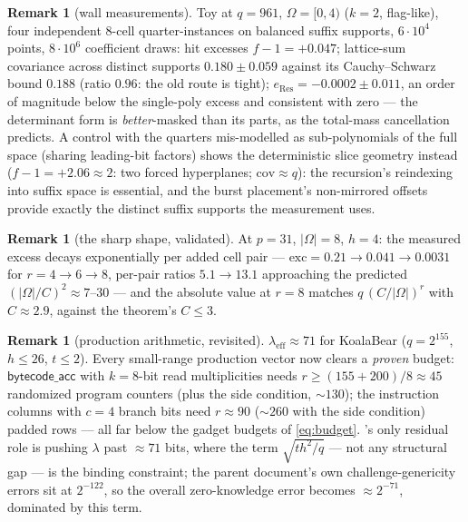 \documentclass{article}
\theoremstyle{definition}
\newtheorem{remark}[theorem]{Remark}
\begin{document}
\begin{remark}[wall measurements]\label{rem:numI}
Toy at $q = 961$, $\Omega = [0,4)$ ($k = 2$, flag-like), four independent $8$-cell quarter-instances on balanced suffix supports, $6 \cdot 10^4$ points, $8 \cdot 10^6$ coefficient draws: hit excesses $f - 1 = +0.047$; lattice-sum covariance across distinct supports $0.180 \pm 0.059$ against its Cauchy--Schwarz bound $0.188$ (ratio $0.96$: the old route is tight); $e_{\mathrm{Res}} = -0.0002 \pm 0.011$, an order of magnitude below the single-poly excess and consistent with zero --- the determinant form is \emph{better}-masked than its parts, as the total-mass cancellation predicts. A control with the quarters mis-modelled as sub-polynomials of the full space (sharing leading-bit factors) shows the deterministic slice geometry instead ($f - 1 = +2.06 \approx 2$: two forced hyperplanes; $\mathrm{cov} \approx q$): the recursion's reindexing into suffix space is essential, and the burst placement's non-mirrored offsets provide exactly the distinct suffix supports the measurement uses.
\end{remark}

\begin{remark}[the sharp shape, validated]\label{rem:numH}
At $p = 31$, $|\Omega| = 8$, $h = 4$: the measured excess decays exponentially per added cell pair --- $\mathrm{exc} = 0.21 \to 0.041 \to 0.0031$ for $r = 4 \to 6 \to 8$, per-pair ratios $5.1 \to 13.1$ approaching the predicted $(|\Omega|/C)^2 \approx 7$--$30$ --- and the absolute value at $r = 8$ matches $q\,(C/|\Omega|)^{r}$ with $C \approx 2.9$, against the theorem's $C \leq 3$.
\end{remark}

\begin{remark}[production arithmetic, revisited]\label{rem:production}
$\lambda_{\mathrm{eff}} \approx 71$ for KoalaBear ($q = 2^{155}$, $h \leq 26$, $t \leq 2$). Every small-range production vector now clears a \emph{proven} budget: $\textsf{bytecode\_acc}$ with $k = 8$-bit read multiplicities needs $r \geq (155 + 200)/8 \approx 45$ randomized program counters (plus the side condition, $\sim 130$); the instruction columns with $c = 4$ branch bits need $r \approx 90$ ($\sim 260$ with the side condition) padded rows --- all far below the gadget budgets of \cref{eq:budget}. 's only residual role is pushing $\lambda$ past $\approx 71$ bits, where the term $\sqrt{t h^2/q}$ --- not any structural gap --- is the binding constraint; the parent document's own challenge-genericity errors sit at $2^{-122}$, so the overall zero-knowledge error becomes $\approx 2^{-71}$, dominated by this term.
\end{remark}
\end{document}
